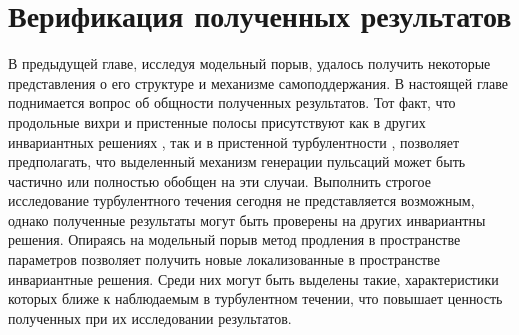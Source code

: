 
\chapter{Верификация полученных результатов}


В предыдущей главе, исследуя модельный порыв, удалось получить некоторые представления о его структуре и механизме самоподдержания. В настоящей главе поднимается вопрос об общности полученных результатов. Тот факт, что продольные вихри и пристенные полосы присутствуют как в других инвариантных решениях \cite{Kawahara2012}, так и в пристенной турбулентности \cite{Kline1967, Smith1983, Schoppa2002}, позволяет предполагать, что выделенный механизм генерации пульсаций может быть частично или полностью обобщен на эти случаи. Выполнить строгое исследование турбулентного течения сегодня не представляется возможным, однако полученные результаты могут быть проверены на других инвариантны решения. Опираясь на модельный порыв метод продления в пространстве параметров \cite{Sanchez2004, Viswanath2007, Dijkstra2014} позволяет получить новые локализованные в пространстве инвариантные решения. Среди них могут быть выделены такие, характеристики которых ближе к наблюдаемым в турбулентном течении, что повышает ценность полученных при их исследовании результатов. 

